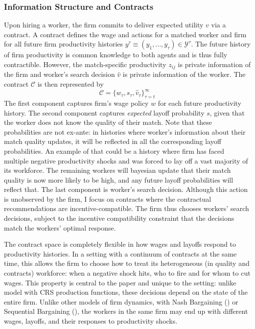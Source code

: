 \subsubsection*{Information Structure and Contracts}
Upon hiring a worker, the firm commits to deliver expected utility $v$ via a contract. A contract defines the wage and
actions for a matched worker and firm for all future firm productivity histories $y^\tau\equiv (y_1,...,y_\tau)\in \mathcal{Y}^{\tau}$. The future history of firm productivity is common knowledge to both agents and is thus fully contractible. However, the match-specific productivity $z_{ij}$ is private information of the firm and worker's search decision $\hat{v}$ is private information of the worker. The contract $\mathcal{C}$ is then represented by 
\begin{equation}
\mathcal{C}=\{w_{\tau},s_{\tau},\hat{v}_\tau\}_{\tau=t}^\infty
\end{equation}
The first component captures firm's wage policy $w$ for each future productivity history. The second component captures \textit{expected} layoff probability $s$, given that the worker does not know the quality of their match. Note that these probabilities are not ex-ante: in histories where worker's information about their match quality updates, it will be reflected in all the corresponding layoff probabilities. An example of that could be a history where firm has faced multiple negative productivity shocks and was forced to lay off a vast majority of its workforce. The remaining workers will bayesian update that their match quality is now more likely to be high, and any future layoff probabilities will reflect that. 
The last component is worker's search decision. Although this action is unobserved by the firm, I focus on contracts where the contractual recommendations are incentive-compatible. The firm thus chooses workers’ search decisions, subject to the incentive compatibility constraint that the decisions match the workers’ optimal response.

The contract space is completely flexible in how wages and layoffs respond to productivity histories. In a setting with a continuum of contracts at the same time, this allows the firm to choose how to treat its heterogeneous (in quality and contracts) workforce: when a negative shock hits, who to fire and for whom to cut wages. This property is central to the paper and unique to the setting: unlike model with CRS production functions, these decisions depend on the state of the entire firm. Unlike other models of firm dynamics, with Nash Bargaining (\textcite{mccrary2022}) or Sequential Bargaining (\textcite{bilal2022}), the workers in the same firm may end up with different wages, layoffs, and their responses to productivity shocks. %
